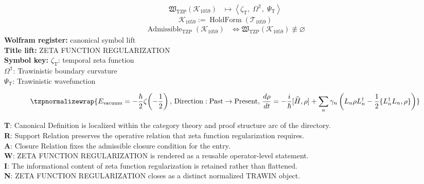 \noindent
\begin{minipage}[t]{0.48\linewidth}
\begingroup
\small
\[
\begin{aligned}
\mathfrak{W}_{\mathrm{TZP}}\!\left(\mathcal{K}_{1059}\right)
&\longmapsto
\left\langle \zeta_{\mathrm{T}},\; \Omega^{\mathbb{T}},\; \Psi_{\mathrm{T}} \right\rangle
\end{aligned}
\]
\[
\mathcal{K}_{1059}
:=
\operatorname{HoldForm}\!\left(\mathcal{T}_{1059}\right)
\]
\[
\begin{aligned}
\operatorname{Admissible}_{\mathrm{TZP}}\!\left(\mathcal{K}_{1059}\right)
&\Longleftrightarrow
\mathfrak{W}_{\mathrm{TZP}}\!\left(\mathcal{K}_{1059}\right)\not\equiv\varnothing
\end{aligned}
\]
\textbf{Wolfram register:} canonical symbol lift\\
\textbf{Title lift:} ZETA FUNCTION REGULARIZATION\\
\textbf{Symbol key:} \(\zeta_{\mathrm{T}}\): temporal zeta function\\ \(\Omega^{\mathbb{T}}\): Trawinistic boundary curvature\\ \(\Psi_{\mathrm{T}}\): Trawinistic wavefunction
\par
\endgroup
\end{minipage}\hfill
\begin{minipage}[t]{0.48\linewidth}
\[
\tzpnormalizewrap{E_{\mathrm{vacuum}}=-\frac{\hbar}{2}\zeta\!\left(-\frac{1}{2}\right),\,\mathrm{Direction}:\mathrm{Past}\to\mathrm{Present},\,\frac{d\rho}{dt}=-\frac{i}{\hbar}[\widehat{H},\rho]+\sum_n\gamma_n\left(L_n\rho L_n^\dagger-\frac{1}{2}\{L_n^\dagger L_n,\rho\}\right)}
\]

\small
\textbf{T}: Canonical Definition is localized within the category theory and proof structure arc of the directory.\\
\textbf{R}: Support Relation preserves the operative relation that zeta function regularization requires.\\
\textbf{A}: Closure Relation fixes the admissible closure condition for the entry.\\
\textbf{W}: ZETA FUNCTION REGULARIZATION is rendered as a reusable operator-level statement.\\
\textbf{I}: The informational content of zeta function regularization is retained rather than flattened.\\
\textbf{N}: ZETA FUNCTION REGULARIZATION closes as a distinct normalized TRAWIN object.
\normalsize
\end{minipage}

